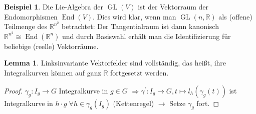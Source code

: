 \documentclass[a4paper]{scrreprt}
\numberwithin{equation}{chapter}
\DeclareMathOperator{\GL}{GL}
\DeclareMathOperator{\End}{End}
\newcommand{\R}{\mathbb{R}}
\theoremstyle{definition}
\newtheorem{lemma}[defn]{Lemma}
\newtheorem{bsp}[defn]{Beispiel}
\begin{document}
		\begin{bsp}\hfill
			Die Lie-Algebra der $\GL(V)$ ist der Vektorraum der Endomorphismen $\End(V)$. Dies wird klar, wenn man $\GL(n,\R)$ als (offene) Teilmenge des $\R^{n^2}$ betrachtet: Der Tangentialraum ist dann kanonisch $\R^{n^2}\cong\End(\R^n)$ und durch Basiswahl erhält man die Identifizierung für beliebige (reelle) Vektorräume.
		\end{bsp}
		\begin{lemma}
			Linksinvariante Vektorfelder sind vollständig, das heißt, ihre Integralkurven können auf ganz $\R$ fortgesetzt werden.
			\begin{proof}
				$\gamma_g\colon I_g\rightarrow G$ Integralkurve in $g\in G$ $\Rightarrow \gamma^{\prime}\colon I_g\rightarrow G, t\mapsto l_h(\gamma_g(t))$ ist Integralkurve in $h\cdot g\;\forall h\in\gamma_g(I_g)$ (Kettenregel) $\rightarrow$ Setze $\gamma_g$ fort.
			\end{proof}
		\end{lemma}
\end{document}
